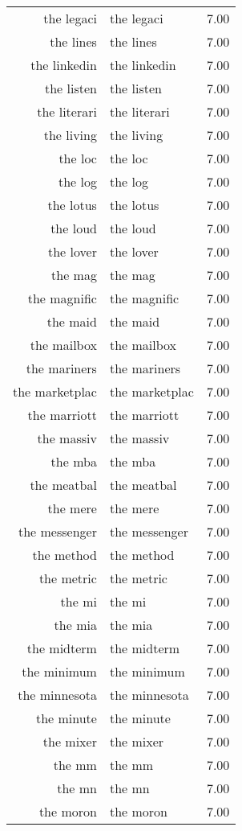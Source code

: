 \begin{table}[ht]
\begin{tabular}{rlr}
  the legaci & the legaci & 7.00 \\ 
  the lines & the lines & 7.00 \\ 
  the linkedin & the linkedin & 7.00 \\ 
  the listen & the listen & 7.00 \\ 
  the literari & the literari & 7.00 \\ 
  the living & the living & 7.00 \\ 
  the loc & the loc & 7.00 \\ 
  the log & the log & 7.00 \\ 
  the lotus & the lotus & 7.00 \\ 
  the loud & the loud & 7.00 \\ 
  the lover & the lover & 7.00 \\ 
  the mag & the mag & 7.00 \\ 
  the magnific & the magnific & 7.00 \\ 
  the maid & the maid & 7.00 \\ 
  the mailbox & the mailbox & 7.00 \\ 
  the mariners & the mariners & 7.00 \\ 
  the marketplac & the marketplac & 7.00 \\ 
  the marriott & the marriott & 7.00 \\ 
  the massiv & the massiv & 7.00 \\ 
  the mba & the mba & 7.00 \\ 
  the meatbal & the meatbal & 7.00 \\ 
  the mere & the mere & 7.00 \\ 
  the messenger & the messenger & 7.00 \\ 
  the method & the method & 7.00 \\ 
  the metric & the metric & 7.00 \\ 
  the mi & the mi & 7.00 \\ 
  the mia & the mia & 7.00 \\ 
  the midterm & the midterm & 7.00 \\ 
  the minimum & the minimum & 7.00 \\ 
  the minnesota & the minnesota & 7.00 \\ 
  the minute & the minute & 7.00 \\ 
  the mixer & the mixer & 7.00 \\ 
  the mm & the mm & 7.00 \\ 
  the mn & the mn & 7.00 \\ 
  the moron & the moron & 7.00 \\ 

\end{tabular}
\end{table}
